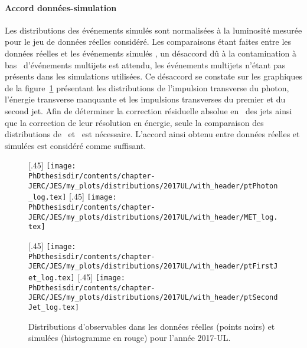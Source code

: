 \paragraph{Accord données-simulation}
Les distributions des événements simulés sont normalisées à la luminosité mesurée pour le jeu de données réelles considéré.
Les comparaisons étant faites entre les données réelles et les événements simulés \Gjets, un désaccord dû à la contamination à bas \pT\ d'événements multijets est attendu, les événements multijets n'étant pas présents dans les simulations utilisées.
Ce désaccord se constate sur les graphiques de la figure~\ref{fig-distribs_Gjets_17UL} présentant les distributions de l'impulsion transverse du photon, l'énergie transverse manquante et les impulsions transverses du premier et du second jet.
Afin de déterminer la correction résiduelle absolue en \pT\ des jets ainsi que la correction de leur résolution en énergie, seule la comparaison des distributions de \Rbal\ et \RMPF\ est nécessaire.
L'accord ainsi obtenu entre données réelles et simulées est considéré comme suffisant.
\begin{figure}[h]
\centering
{}[.45\textwidth]
{\texttt{[image: \\PhDthesisdir/contents/chapter-JERC/JES/my\_plots/distributions/2017UL/with\_header/ptPhoton\_log.tex]}}
\hfill
{}[.45\textwidth]
{\texttt{[image: \\PhDthesisdir/contents/chapter-JERC/JES/my\_plots/distributions/2017UL/with\_header/MET\_log.tex]}}

\vspace{\baselineskip}

[.45\textwidth]
{\texttt{[image: \\PhDthesisdir/contents/chapter-JERC/JES/my\_plots/distributions/2017UL/with\_header/ptFirstJet\_log.tex]}}
\hfill
{}[.45\textwidth]
{\texttt{[image: \\PhDthesisdir/contents/chapter-JERC/JES/my\_plots/distributions/2017UL/with\_header/ptSecondJet\_log.tex]}}

\caption[Observables d'événements \Gjets\ en 2017-UL.]{Distributions d'observables dans les données réelles (points noirs) et simulées (histogramme en rouge) pour l'année 2017-UL.}
\label{fig-distribs_Gjets_17UL}
\end{figure}
